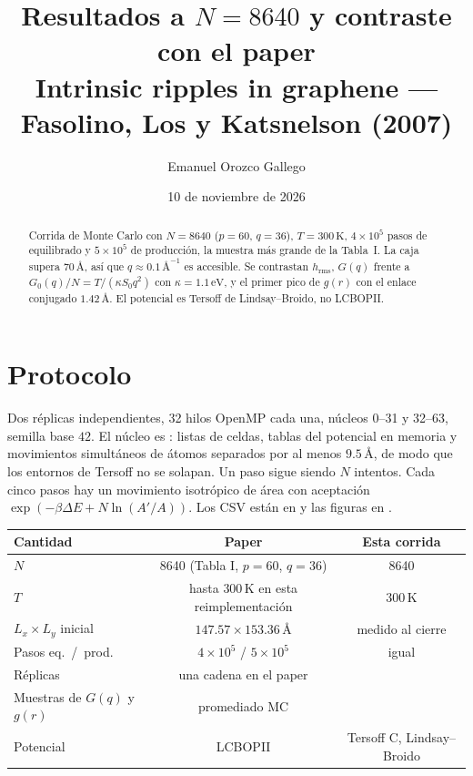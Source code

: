 \documentclass[11pt,a4paper]{article}
\title{Resultados a $N=8640$ y contraste con el paper\\[0.35em]
\large Intrinsic ripples in graphene --- Fasolino, Los y Katsnelson (2007)}
\author{Emanuel Orozco Gallego}
\date{10 de noviembre de 2026}
\begin{document}
\maketitle

\begin{abstract}
Corrida de Monte Carlo con $N=8640$ ($p=60$, $q=36$), $T=300\,\mathrm{K}$, $4\times 10^5$ pasos de equilibrado y $5\times 10^5$ de producción, la muestra más grande de la Tabla~I. La caja supera $70\,\text{\AA}$, así que $q\approx 0.1\,\text{\AA}^{-1}$ es accesible. Se contrastan $h_{\mathrm{rms}}$, $G(q)$ frente a $G_0(q)/N=T/(\kappa S_0 q^2)$ con $\kappa=1.1\,\mathrm{eV}$, y el primer pico de $g(r)$ con el enlace conjugado $1.42\,\text{\AA}$. El potencial es Tersoff de Lindsay--Broido, no LCBOPII.
\end{abstract}

\tableofcontents
\vspace{0.5em}

\section{Protocolo}

Dos réplicas independientes, 32 hilos OpenMP cada una, núcleos 0--31 y 32--63, semilla base $42$. El núcleo es : listas de celdas, tablas del potencial en memoria y movimientos simultáneos de átomos separados por al menos $9.5\,\text{\AA}$, de modo que los entornos de Tersoff no se solapan. Un paso sigue siendo $N$ intentos. Cada cinco pasos hay un movimiento isotrópico de área con aceptación $\exp(-\beta\Delta E+N\ln(A'/A))$. Los CSV están en  y las figuras en .

\begin{center}
\small
\begin{tabular}{lcc}
\toprule
Cantidad & Paper & Esta corrida \\
\midrule
$N$ & 8640 (Tabla I, $p=60$, $q=36$) & 8640 \\
$T$ & hasta $300\,\mathrm{K}$ en esta reimplementación & $300\,\mathrm{K}$ \\
$L_x\times L_y$ inicial & $147.57\times 153.36\,\text{\AA}$ & medido al cierre \\
Pasos eq.\ /\ prod. & $4\times 10^5$ / $5\times 10^5$ & igual \\
Réplicas & una cadena en el paper & \Nrep{} \\
Muestras de $G(q)$ y $g(r)$ & promediado MC & \NsampTot{} \\
Potencial & LCBOPII & Tersoff C, Lindsay--Broido \\
\bottomrule
\end{tabular}
\end{center}
\end{document}
